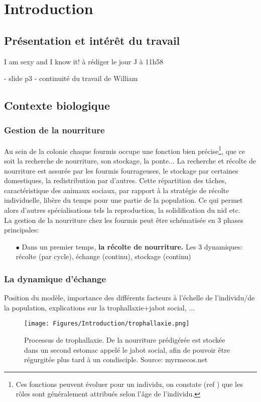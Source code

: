 \chapter{Introduction}

\section{Présentation et intérêt du travail}
I am sexy and I know it! à rédiger le jour J à 11h58

- slide p3
- continuité du travail de William

\section{Contexte biologique}

\subsection{Gestion de la nourriture}

Au sein de la colonie chaque fourmis occupe une fonction bien précise\footnote{Ces fonctions peuvent évoluer pour un individu, on constate (ref \fixme) que les rôles sont généralement attribués selon l'âge de l'individu.}, que ce soit la recherche de nourriture, son stockage, la ponte... La recherche et récolte de nourriture est assurée par les fourmis fourrageuses, le stockage par certaines domestiques, la redistribution par d'autres. Cette répartition des tâches, caractéristique des animaux sociaux, par rapport à la stratégie de récolte individuelle, libère du temps pour une partie de la population. Ce qui permet alors d'autres spécialisations tels la reproduction, la solidification du nid etc.\\


La gestion de la nourriture chez les fourmis peut être schématisée en 3 phases principales:

\begin{itemize}
\item[$\bullet$] Dans un premier temps, \textbf{la récolte de nourriture.}
Les 3 dynamiques: récolte (par cycle), échange (continu), stockage (continu)
\end{itemize}


\subsection{La dynamique d'échange}

Position du modèle, importance des différents facteurs à l'échelle de l'individu/de la population, explications sur la trophallaxie+jabot social, ...

\begin{figure}[h]
\centering
\texttt{[image: Figures/Introduction/trophallaxie.png]}
\caption{Processus de trophallaxie. De la nourriture prédigérée est stockée dans un second estomac appelé le jabot social, afin de pouvoir être régurgitée plus tard à un condisciple. Source: myrmecos.net}
\label{trophallaxie}
\end{figure}
